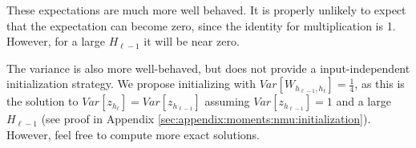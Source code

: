 These expectations are much more well behaved. It is properly unlikely to expect that the expectation can become zero, since the identity for multiplication is 1. However, for a large $H_{\ell-1}$ it will be near zero.

The variance is also more well-behaved, but does not provide a input-independent initialization strategy. We propose initializing with $Var[W_{h_{\ell-1},h_\ell}] = \frac{1}{4}$, as this is the solution to $Var[z_{h_\ell}] = Var[z_{h_{\ell-1}}]$ assuming $Var[z_{h_{\ell-1}}] = 1$ and a large $H_{\ell-1}$ (see proof in Appendix \ref{sec:appendix:moments:nmu:initialization}). However, feel free to compute more exact solutions.